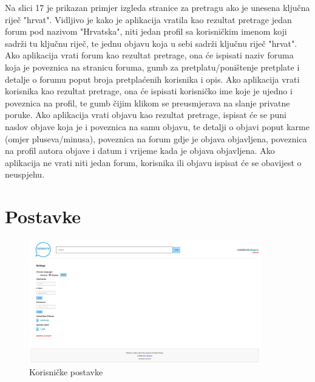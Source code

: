 \documentclass{foi}
\begin{document}
Na slici 17 je prikazan primjer izgleda stranice za pretragu ako je unesena ključna riječ "hrvat". Vidljivo je kako je aplikacija vratila kao rezultat pretrage jedan forum pod nazivom "Hrvatska", niti jedan profil sa korisničkim imenom koji sadrži tu ključnu riječ, te jednu objavu koja u sebi sadrži ključnu riječ "hrvat". Ako aplikacija vrati forum kao rezultat pretrage, ona će ispisati naziv foruma koja je poveznica na stranicu foruma, gumb za pretplatu/poništenje pretplate i detalje o forumu poput broja pretplaćenih korisnika i opis. Ako aplikacija vrati korisnika kao rezultat pretrage, ona će ispisati korisničko ime koje je ujedno i poveznica na profil, te gumb čijim klikom se preusmjerava na slanje privatne poruke. Ako aplikacija vrati objavu kao rezultat pretrage, ispisat će se puni naslov objave koja je i poveznica na samu objavu, te detalji o objavi poput karme (omjer pluseva/minusa), poveznica na forum gdje je objava objavljena, poveznica na profil autora objave i datum i vrijeme kada je objava objavljena. Ako aplikacija ne vrati niti jedan forum, korisnika ili objavu ispisat će se obavijest o neuspjehu.

\section{Postavke}

\begin{figure}[h!]
    \centering
    \includegraphics[width=0.9\textwidth]{slike/postavke.png}
    \caption{Korisničke postavke}
\end{figure}
\end{document}
